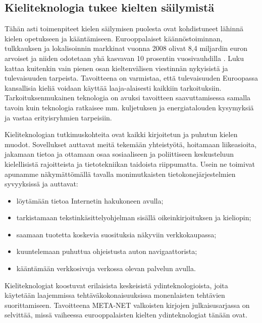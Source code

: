 \begin{multicols}{2}
\subsection{Kieliteknologia tukee kielten säilymistä}

Tähän asti toimenpiteet kielen säilymisen puolesta ovat kohdistuneet lähinnä kielen opetukseen ja kääntämiseen. Eurooppalaiset käännöstoiminnan, tulkkauksen ja lokalisoinnin markkinat vuonna 2008 olivat 8,4 miljardin euron arvoiset ja niiden odotetaan yhä kasvavan 10 prosentin vuosivauhdilla \cite{EC-size}. Luku kattaa kuitenkin vain pienen osan kieltenvälisen viestinnän nykyisistä ja tulevaisuuden tarpeista. Tavoitteena on varmistaa, että tulevaisuuden Euroopassa kansallisia kieliä voidaan käyttää laaja-alaisesti kaikkiin tarkoituksiin. Tarkoituksenmukainen teknologia on avuksi tavoitteen saavuttamisessa samalla tavoin kuin teknologia ratkaisee mm. kuljetuksen ja energiatalouden kysymyksiä ja vastaa erityisryhmien tarpeisiin.  


Kieliteknologian tutkimuskohteita ovat kaikki kirjoitetun ja puhutun kielen muodot. Sovellukset auttavat meitä tekemään yhteistyötä, hoitamaan liikeasioita, jakamaan tietoa ja ottamaan osaa sosiaaliseen ja poliittiseen keskusteluun kielellisistä rajoitteista ja tietotekniikan taidoista riippumatta. Usein ne toimivat apunamme näkymättömällä tavalla monimutkaisten tietokonejärjestelmien syvyyksissä ja auttavat:

\begin{itemize}
\item löytämään tietoa Internetin hakukoneen avulla;
\item tarkistamaan tekstinkäsittelyohjelman sisällä oikeinkirjoituksen ja kieliopin;
\item saamaan tuotetta koskevia suosituksia näkyviin verkkokaupassa;
\item kuuntelemaan puhuttua ohjeistusta auton navigaattorista;
\item kääntämään verkkosivuja verkossa olevan palvelun avulla.
\end{itemize}

Kieliteknologiat koostuvat erilaisista keskeisistä ydinteknologioista, joita käytetään laajemmissa tehtäväkokonaisuuksissa monenlaisten tehtävien suorittamiseen. Tavoitteena META-NET valkoisten kirjojen julkaisusarjassa on selvittää, missä vaiheessa eurooppalaisten kielten ydinteknologiat tänään ovat.


\end{multicols}
